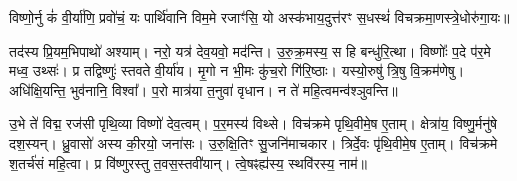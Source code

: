 


विष्णो॒र्नु कं॑ वी॒र्या॑णि॒ प्रवो॑चं॒ यः पार्थि॑वानि विम॒मे रजाꣳ॑सि॒ यो अस्क॑भाय॒दुत्त॑रꣳ स॒धस्थं॑ विचक्रमा॒णस्त्रे॒धोरु॑गा॒यः॥ 

तद॑स्य प्रि॒यम॒भिपाथो॑ अश्याम्। नरो॒ यत्र॑ देव॒यवो॒ मद॑न्ति। उ॒रु॒क्र॒मस्य॒ स हि बन्धु॑रि॒त्था। विष्णोः᳚ प॒दे प॑र॒मे मध्व॒ उथ्सः॑। प्र तद्विष्णुः॑  स्तवते वी॒र्या॑य। मृ॒गो न भी॒मः कु॑च॒रो गि॑रि॒ष्ठाः। यस्यो॒रुषु॑ त्रि॒षु वि॒क्रम॑णेषु। अधि॑क्षि॒यन्ति॒ भुव॑नानि॒ विश्वा᳚। प॒रो मात्र॑या त॒नुवा॑ वृधान। न ते॑ महि॒त्वमन्व॑श्ञुवन्ति॥ 

उ॒भे ते॑ विद्म॒ रज॑सी पृथि॒व्या विष्णो॑ देव॒त्वम्। प॒र॒मस्य॑ विथ्से। विच॑क्रमे पृथि॒वीमे॒ष ए॒ताम्। क्षेत्रा॑य॒ विष्णु॒र्मनु॑षे दश॒स्यन्। ध्रु॒वासो॑ अस्य की॒रयो॒ जना॑सः। उ॒रु॒क्षि॒तिꣳ सु॒जनि॑माचकार। त्रिर्दे॒वः पृ॑थि॒वीमे॒ष ए॒ताम्। विच॑क्रमे श॒तर्च॑सं महि॒त्वा। प्र वि॑ष्णुरस्तु त॒वस॒स्तवी॑यान्। त्वे॒षꣴह्य॑स्य॒ स्थवि॑रस्य॒ नाम॑॥ 

